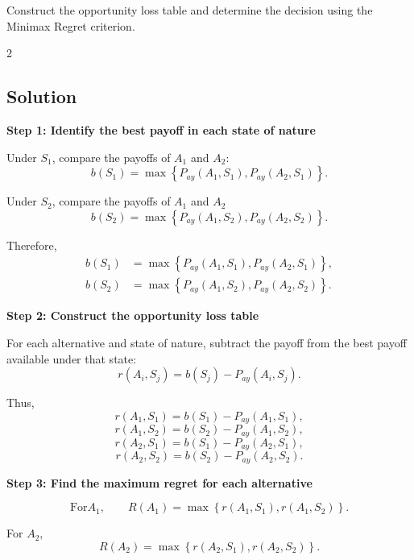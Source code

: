 	Construct the opportunity loss table and determine the decision using
	the Minimax Regret criterion.
	
	
	\noindent
	\setlength{\columnseprule}{0.4pt}
	
	\begin{multicols}{2}
		
	\subsection{Solution}
	
	\textbf{Step 1: Identify the best payoff in each state of nature}
	
	Under $S_1$, compare the payoffs of $A_1$ and $A_2$:
	\[
	b(S_1)
	=
	\max
	\left\{
	P_{ay}(A_1,S_1),
	P_{ay}(A_2,S_1)
	\right\}.
	\]
	
	Under $S_2$, compare the payoffs of $A_1$ and $A_2$
	\[
	b(S_2)
	=
	\max
	\left\{
	P_{ay}(A_1,S_2),
	P_{ay}(A_2,S_2)
	\right\}.
	\]
	
	Therefore,
	\[
	\begin{aligned}
		b(S_1)
		&=
		\max
		\left\{
		P_{ay}(A_1,S_1),
		P_{ay}(A_2,S_1)
		\right\},
		\\
		b(S_2)
		&=
		\max
		\left\{
		P_{ay}(A_1,S_2),
		P_{ay}(A_2,S_2)
		\right\}.
	\end{aligned}
	\]
	
		\vspace{0pt}
		
		\textbf{Step 2: Construct the opportunity loss table}
		
		For each alternative and state of nature, subtract the payoff from
		the best payoff available under that state:
		\[
		r(A_i,S_j)
		=
		b(S_j)-P_{ay}(A_i,S_j).
		\]
		
		Thus,
		\[
		r(A_1,S_1)
		=
		b(S_1)-P_{ay}(A_1,S_1),
		\]
		\[
		r(A_1,S_2)
		=
		b(S_2)-P_{ay}(A_1,S_2),
		\]
		\[
		r(A_2,S_1)
		=
		b(S_1)-P_{ay}(A_2,S_1),
		\]
		\[
		r(A_2,S_2)
		=
		b(S_2)-P_{ay}(A_2,S_2).
		\]
		
				\columnbreak
				
		\textbf{Step 3: Find the maximum regret for each alternative}
		
		\[
		\text{For} A_1,
		\qquad
		R(A_1)
		=
		\max
		\left\{
		r(A_1,S_1),r(A_1,S_2)
		\right\}.
		\]
		
		For $A_2$,
		\[
		R(A_2)
		=
		\max
		\left\{
		r(A_2,S_1),r(A_2,S_2)
		\right\}.
		\]
		

\end{multicols}
